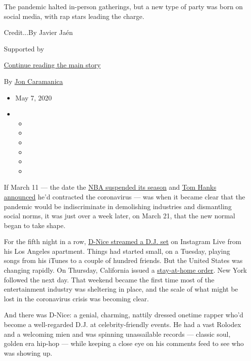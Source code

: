 The pandemic halted in-person gatherings, but a new type of party was
born on social media, with rap stars leading the charge.

Credit...By Javier Jaén

Supported by

\protect\hyperlink{after-sponsor}{Continue reading the main story}

By \href{https://www.nytimes3xbfgragh.onion/by/jon-caramanica}{Jon
Caramanica}

\begin{itemize}
\item
  May 7, 2020
\item
  \begin{itemize}
  \item
  \item
  \item
  \item
  \item
  \item
  \end{itemize}
\end{itemize}

If March 11 --- the date the
\href{https://www.nytimes3xbfgragh.onion/2020/03/11/sports/basketball/nba-season-suspended-coronavirus.html}{NBA
suspended its season} and
\href{https://www.nytimes3xbfgragh.onion/2020/03/11/business/media/tom-hanks-coronavirus.html}{Tom
Hanks announced} he'd contracted the coronavirus --- was when it became
clear that the pandemic would be indiscriminate in demolishing
industries and dismantling social norms, it was just over a week later,
on March 21, that the new normal began to take shape.

For the fifth night in a row,
\href{https://www.nytimes3xbfgragh.onion/2020/03/21/arts/d-nice-instagram.html}{D-Nice
streamed a D.J. set} on Instagram Live from his Los Angeles apartment.
Things had started small, on a Tuesday, playing songs from his iTunes to
a couple of hundred friends. But the United States was changing rapidly.
On Thursday, California issued a
\href{https://www.gov.ca.gov/2020/03/19/governor-gavin-newsom-issues-stay-at-home-order/}{stay-at-home
order}. New York followed the next day. That weekend became the first
time most of the entertainment industry was sheltering in place, and the
scale of what might be lost in the coronavirus crisis was becoming
clear.

And there was D-Nice: a genial, charming, nattily dressed onetime rapper
who'd become a well-regarded D.J. at celebrity-friendly events. He had a
vast Rolodex and a welcoming mien and was spinning unassailable records
--- classic soul, golden era hip-hop --- while keeping a close eye on
his comments feed to see who was showing up.

